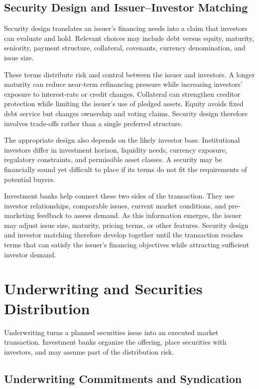 \subsection{Security Design and Issuer--Investor Matching}

Security design translates an issuer's financing needs into a claim that investors can evaluate and hold. Relevant choices may include debt versus equity, maturity, seniority, payment structure, collateral, covenants, currency denomination, and issue size.

These terms distribute risk and control between the issuer and investors. A longer maturity can reduce near-term refinancing pressure while increasing investors' exposure to interest-rate or credit changes. Collateral can strengthen creditor protection while limiting the issuer's use of pledged assets. Equity avoids fixed debt service but changes ownership and voting claims. Security design therefore involves trade-offs rather than a single preferred structure.

The appropriate design also depends on the likely investor base. Institutional investors differ in investment horizon, liquidity needs, currency exposure, regulatory constraints, and permissible asset classes. A security may be financially sound yet difficult to place if its terms do not fit the requirements of potential buyers.

Investment banks help connect these two sides of the transaction. They use investor relationships, comparable issues, current market conditions, and pre-marketing feedback to assess demand. As this information emerges, the issuer may adjust issue size, maturity, pricing terms, or other features. Security design and investor matching therefore develop together until the transaction reaches terms that can satisfy the issuer's financing objectives while attracting sufficient investor demand.

\section{Underwriting and Securities Distribution}

Underwriting turns a planned securities issue into an executed market transaction. Investment banks organize the offering, place securities with investors, and may assume part of the distribution risk.

\subsection{Underwriting Commitments and Syndication}

